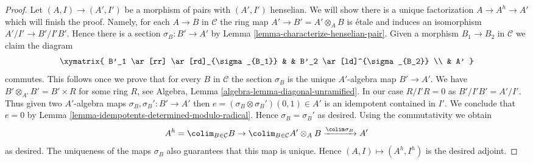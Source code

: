 \begin{proof}
\medskip\noindent
Let $(A, I) \to (A', I')$ be a morphism of pairs with $(A', I')$ henselian.
We will show there is a unique factorization $A \to A^h \to A'$ which will
finish the proof. Namely, for each $A \to B$ in $\mathcal{C}$
the ring map $A' \to B' = A' \otimes_A B$ is \'etale and induces
an isomorphism $A'/I' \to B'/I'B'$. Hence there is a section
$\sigma_B : B' \to A'$ by Lemma \ref{lemma-characterize-henselian-pair}.
Given a morphism $B_1 \to B_2$ in $\mathcal{C}$ we claim the diagram
$$
\xymatrix{
B'_1 \ar[rr] \ar[rd]_{\sigma_{B_1}} & &
B'_2 \ar[ld]^{\sigma_{B_2}} \\
& A'
}
$$
commutes. This follows once we prove that for every $B$ in $\mathcal{C}$
the section $\sigma_B$ is the unique $A'$-algebra map $B' \to A'$.
We have $B' \otimes_{A'} B' = B' \times R$ for some ring $R$, see
Algebra, Lemma \ref{algebra-lemma-diagonal-unramified}. In our case
$R/I'R = 0$ as $B'/I'B' = A'/I'$. Thus given two $A'$-algebra maps
$\sigma_B, \sigma_B' : B' \to A'$ then
$e = (\sigma_B \otimes \sigma_B')(0, 1) \in A'$
is an idempotent contained in $I'$. We conclude that $e = 0$
by Lemma \ref{lemma-idempotents-determined-modulo-radical}.
Hence $\sigma_B = \sigma_B'$ as desired.
Using the commutativity we obtain
$$
A^h = \colim_{B \in \mathcal{C}} B \to
\colim_{B \in \mathcal{C}} A' \otimes_A B \xrightarrow{\colim \sigma_B} A'
$$
as desired. The uniqueness of the maps $\sigma_B$ also guarantees that
this map is unique. Hence $(A, I) \mapsto (A^h, I^h)$ is the desired adjoint.
\end{proof}